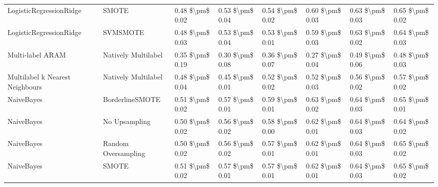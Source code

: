 \begin{tabular}{llllllll}
        LogisticRegressionRidge &                         SMOTE & 0.48 \$\textbackslash pm\$ 0.02 &           0.53 \$\textbackslash pm\$ 0.04 &       0.54 \$\textbackslash pm\$ 0.02 &        0.60 \$\textbackslash pm\$ 0.03 &                         0.63 \$\textbackslash pm\$ 0.03 &     0.65 \$\textbackslash pm\$ 0.02 \\
        LogisticRegressionRidge &                      SVMSMOTE & 0.48 \$\textbackslash pm\$ 0.03 &           0.53 \$\textbackslash pm\$ 0.04 &       0.53 \$\textbackslash pm\$ 0.01 &        0.59 \$\textbackslash pm\$ 0.03 &                         0.63 \$\textbackslash pm\$ 0.02 &     0.64 \$\textbackslash pm\$ 0.03 \\
               Multi-label ARAM &           Natively Multilabel & 0.35 \$\textbackslash pm\$ 0.19 &           0.30 \$\textbackslash pm\$ 0.08 &       0.36 \$\textbackslash pm\$ 0.07 &        0.27 \$\textbackslash pm\$ 0.04 &                         0.49 \$\textbackslash pm\$ 0.06 &     0.48 \$\textbackslash pm\$ 0.03 \\
Multilabel k Nearest Neighbours &           Natively Multilabel & 0.48 \$\textbackslash pm\$ 0.04 &           0.45 \$\textbackslash pm\$ 0.01 &       0.52 \$\textbackslash pm\$ 0.02 &        0.52 \$\textbackslash pm\$ 0.03 &                         0.56 \$\textbackslash pm\$ 0.02 &     0.57 \$\textbackslash pm\$ 0.02 \\
                     NaiveBayes &               BorderlineSMOTE & 0.51 \$\textbackslash pm\$ 0.02 &           0.57 \$\textbackslash pm\$ 0.01 &       0.59 \$\textbackslash pm\$ 0.01 &        0.63 \$\textbackslash pm\$ 0.02 &                         0.64 \$\textbackslash pm\$ 0.03 &     0.65 \$\textbackslash pm\$ 0.01 \\
                     NaiveBayes &                 No Upsampling & 0.50 \$\textbackslash pm\$ 0.02 &           0.56 \$\textbackslash pm\$ 0.02 &       0.58 \$\textbackslash pm\$ 0.00 &        0.62 \$\textbackslash pm\$ 0.01 &                         0.64 \$\textbackslash pm\$ 0.03 &     0.64 \$\textbackslash pm\$ 0.02 \\
                     NaiveBayes &           Random Oversampling & 0.50 \$\textbackslash pm\$ 0.02 &           0.56 \$\textbackslash pm\$ 0.02 &       0.57 \$\textbackslash pm\$ 0.01 &        0.62 \$\textbackslash pm\$ 0.01 &                         0.64 \$\textbackslash pm\$ 0.03 &     0.65 \$\textbackslash pm\$ 0.02 \\
                     NaiveBayes &                         SMOTE & 0.51 \$\textbackslash pm\$ 0.02 &           0.57 \$\textbackslash pm\$ 0.01 &       0.57 \$\textbackslash pm\$ 0.01 &        0.62 \$\textbackslash pm\$ 0.01 &                         0.64 \$\textbackslash pm\$ 0.03 &     0.65 \$\textbackslash pm\$ 0.02 \\

\end{tabular}
